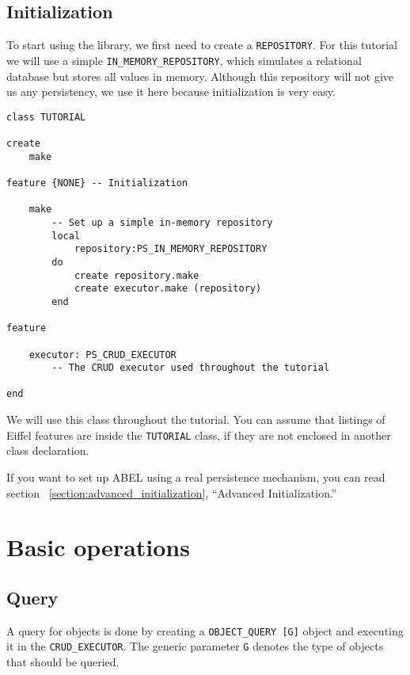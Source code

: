 \subsection{Initialization}

To start using the library, we first need to create a \lstinline!REPOSITORY!.
For this tutorial we will use a simple \lstinline!IN_MEMORY_REPOSITORY!, which simulates a relational database but stores all values in memory.
Although this repository will not give us any persistency, we use it here because initialization is very easy.


\begin{lstlisting}[language=OOSC2Eiffel, captionpos=b, caption={The TUTORIAL class}, label={lst:tutorial_class}]
class TUTORIAL

create
	make

feature {NONE} -- Initialization

	make
		-- Set up a simple in-memory repository
		local
			repository:PS_IN_MEMORY_REPOSITORY
		do
			create repository.make
			create executor.make (repository)
		end

feature
	
	executor: PS_CRUD_EXECUTOR
		-- The CRUD executor used throughout the tutorial

end
\end{lstlisting}

We will use this class throughout the tutorial. You can assume that listings of Eiffel features are inside the \lstinline!TUTORIAL! class, if they are not enclosed in another class declaration.

If you want to set up ABEL using a real persistence mechanism, you can read section ~\ref{section:advanced_initialization}, ``Advanced Initialization.''

\section{Basic operations}

\subsection{Query}

A query for objects is done by creating a \lstinline!OBJECT_QUERY [G]! object and executing it in the \lstinline!CRUD_EXECUTOR!.
The generic parameter \lstinline!G! denotes the type of objects that should be queried.

